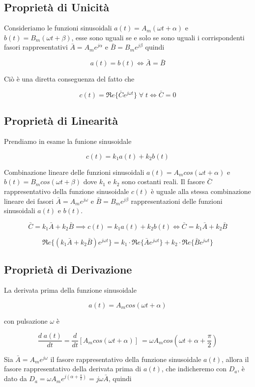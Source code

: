 \documentclass[a4paper]{report}
\begin{document}
\subsection{Propriet\`a di Unicit\`a}
Consideriamo le funzioni sinusoidali $a(t) = A_m(\omega t+\alpha)$ e
$b(t) = B_m(\omega t+\beta)$, esse sono uguali se e solo se sono
uguali i corrispondenti fasori rappresentativi $\bar{A} =
A_me^{j\alpha}$ e $\bar{B} = B_me^{j\beta}$ quindi

\[
a(t)=b(t) \Longleftrightarrow \bar{A}=\bar{B}
\]

Ci\`o \`e una diretta conseguenza del fatto che

\[
c(t)=\Re e \{ \bar{C}e^{j\omega t} \}\; \forall\; t \Longleftrightarrow
\bar{C}=0
\]

\subsection{Propriet\`a di Linearit\`a}
Prendiamo in esame la funione sinusoidale

\[
c(t) = k_1a(t)+k_2b(t)
\]

Combinazione lineare delle funzioni sinusoidali $a(t) = A_mcos(\omega
t + \alpha)$ e \\$b(t) = B_mcos(\omega t + \beta)$ dove $k_1$ e $k_2$
sono costanti reali.
Il fasore $\bar{C}$ rappresentativo della funzione sinusoidale $c(t)$
\`e uguale alla stessa combinazione lineare dei fasori $\bar{A} =
A_me^{j\omega}$ e $\bar{B} = B_me^{j\beta}$ rappresentazioni delle
funzioni sinusoidali $a(t)$ e $b(t)$.

\[
\bar{C} = k_1\bar{A}+k_2\bar{B} \implies c(t)=k_1a(t)+k_2b(t)
\Longleftrightarrow \bar{C}=k_1\bar{A}+k_2\bar{B}
\]

\[
\Re e\{(k_1\bar{A}+k_2\bar{B})e^{j\omega t}\} = k_1\cdot \Re e\{\bar{A}e^{j\omega
  t}\}+k_2\cdot \Re e\{\bar{B}e^{j\omega t}\}
\]

\subsection{Propriet\`a di Derivazione}
La derivata prima della funzione sinusoidale

\[
a(t)=A_mcos(\omega t+\alpha)
\]

con pulsazione $\omega$ \`e

\[
\dfrac{d\;a(t)}{dt}=\dfrac{d}{dt}[A_mcos(\omega t+\alpha)]\ = \omega
A_m cos\left(\omega t+\alpha+ \dfrac{\pi}{2}\right)
\]

Sia $\bar{A} = A_me^{j\omega}$ il fasore rappresentativo della
funzione sinusoidale $a(t)$, allora il fasore rappresentativo della
derivata prima di $a(t)$, che indicheremo con $D_a$, \`e dato da $D_a
= \omega A_m e^{j \left(\alpha+ \frac{\pi}{2}\right)} = j\omega
\bar{A}$, quindi
\end{document}
